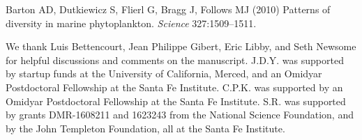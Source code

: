 \documentclass{pnastwo}
\begin{document}
\begin{article}
{\begin{thebibliography}{10}
Barton AD, Dutkiewicz S, Flierl G, Bragg J, Follows MJ
\newblock (2010) {Patterns of diversity in marine phytoplankton}.
\newblock \emph{Science} 327:1509--1511.

\end{thebibliography}

}

\begin{acknowledgments}
  We thank Luis Bettencourt, Jean Philippe Gibert, Eric Libby, and Seth Newsome for helpful
  discussions and comments on the manuscript.  J.D.Y. was supported by
  startup funds at the University of California, Merced, and an Omidyar
  Postdoctoral Fellowship at the Santa Fe Institute.  C.P.K. was supported by
  an Omidyar Postdoctoral Fellowship at the Santa Fe Institute.  S.R. was
  supported by grants DMR-1608211 and 1623243 from the National Science
  Foundation, and by the John Templeton Foundation, all at the Santa Fe
  Institute.
\end{acknowledgments}






\end{article}





% 

% 
\end{document}
